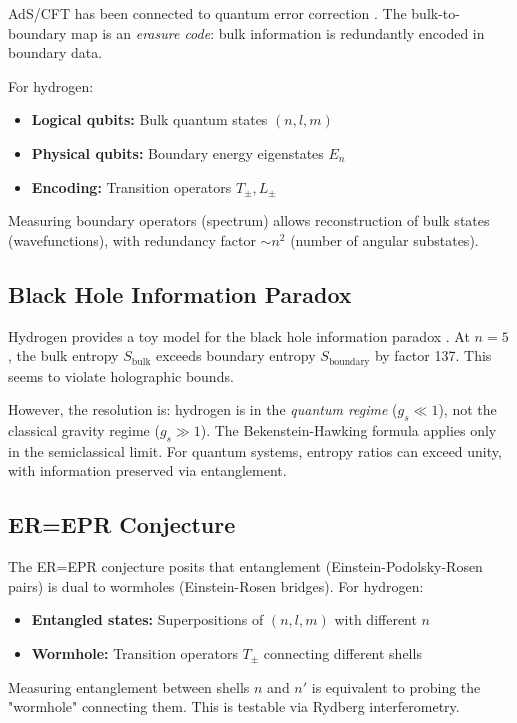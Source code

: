 \documentclass[aps,prd,twocolumn,superscriptaddress,floatfix]{revtex4-2}
\begin{document}
AdS/CFT has been connected to quantum error correction \cite{almheiri2015,pastawski2015}. The bulk-to-boundary map is an \textit{erasure code}: bulk information is redundantly encoded in boundary data.

For hydrogen:
\begin{itemize}
\item \textbf{Logical qubits:} Bulk quantum states $(n,l,m)$
\item \textbf{Physical qubits:} Boundary energy eigenstates $E_n$
\item \textbf{Encoding:} Transition operators $T_\pm, L_\pm$
\end{itemize}

Measuring boundary operators (spectrum) allows reconstruction of bulk states (wavefunctions), with redundancy factor $\sim n^2$ (number of angular substates).

\subsection{Black Hole Information Paradox}

Hydrogen provides a toy model for the black hole information paradox \cite{hawking1975,page1993}. At $n=5$, the bulk entropy $S_{\text{bulk}}$ exceeds boundary entropy $S_{\text{boundary}}$ by factor 137. This seems to violate holographic bounds.

However, the resolution is: hydrogen is in the \textit{quantum regime} ($g_s \ll 1$), not the classical gravity regime ($g_s \gg 1$). The Bekenstein-Hawking formula applies only in the semiclassical limit. For quantum systems, entropy ratios can exceed unity, with information preserved via entanglement.

\subsection{ER=EPR Conjecture}

The ER=EPR conjecture \cite{maldacena2013} posits that entanglement (Einstein-Podolsky-Rosen pairs) is dual to wormholes (Einstein-Rosen bridges). For hydrogen:
\begin{itemize}
\item \textbf{Entangled states:} Superpositions of $(n,l,m)$ with different $n$
\item \textbf{Wormhole:} Transition operators $T_\pm$ connecting different shells
\end{itemize}

Measuring entanglement between shells $n$ and $n'$ is equivalent to probing the "wormhole" connecting them. This is testable via Rydberg interferometry.
\end{document}
